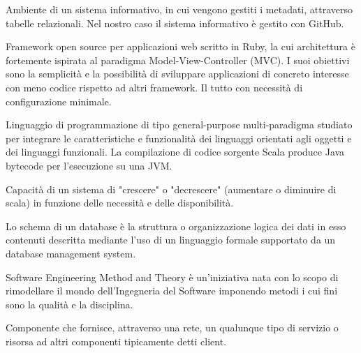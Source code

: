 

Ambiente di un sistema informativo, in cui vengono gestiti i metadati, attraverso tabelle relazionali.
Nel nostro caso il sistema informativo è gestito con GitHub. \\


Framework open source per applicazioni web scritto in Ruby, la cui architettura è fortemente ispirata al paradigma Model-View-Controller (MVC). I suoi obiettivi sono la semplicità e la possibilità di sviluppare applicazioni di concreto interesse con meno codice rispetto ad altri framework. Il tutto con necessità di configurazione minimale. \\



Linguaggio di programmazione di tipo general-purpose multi-paradigma studiato per integrare le caratteristiche e funzionalità dei linguaggi orientati agli oggetti e dei linguaggi funzionali. La compilazione di codice sorgente Scala produce Java bytecode per l'esecuzione su una JVM. \\


Capacità di un sistema di "crescere" o "decrescere" (aumentare o diminuire di scala) in funzione delle necessità e delle disponibilità. \\


Lo schema di un database è la struttura o organizzazione logica dei dati in esso contenuti descritta mediante l'uso di un linguaggio formale supportato da un database management system. \\


Software Engineering Method and Theory è un'iniziativa nata con lo scopo di rimodellare il mondo dell'Ingegneria del Software imponendo metodi i cui fini sono la qualità e la disciplina. \\


Componente che fornisce, attraverso una rete, un qualunque tipo di servizio o risorsa ad altri componenti tipicamente detti client. \\


